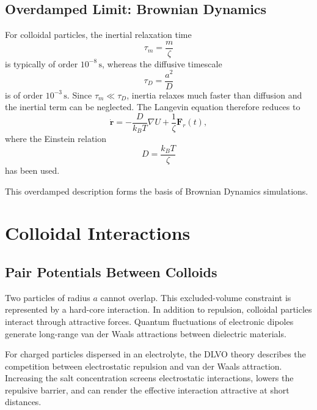 \documentclass[11pt,a4paper]{article}
\begin{document}
\subsection{Overdamped Limit: Brownian Dynamics}

For colloidal particles, the inertial relaxation time
\begin{equation}
    \tau_m = \frac{m}{\zeta}
\end{equation}
is typically of order $10^{-8}\,\mathrm{s}$, whereas the diffusive timescale
\begin{equation}
    \tau_D = \frac{a^2}{D}
\end{equation}
is of order $10^{-3}\,\mathrm{s}$. Since $\tau_m \ll \tau_D$, inertia relaxes much faster than diffusion and the inertial term can be neglected. The Langevin equation therefore reduces to
\begin{equation}
    \dot{\mathbf r}
    =
    -\frac{D}{k_B T}\nabla U
    +
    \frac{1}{\zeta}\mathbf F_r(t),
    \label{eq:bd}
\end{equation}
where the Einstein relation
\begin{equation}
    D = \frac{k_B T}{\zeta}
\end{equation}
has been used.

This overdamped description forms the basis of Brownian Dynamics simulations.

\section{Colloidal Interactions}

\subsection{Pair Potentials Between Colloids}

Two particles of radius $a$ cannot overlap. This excluded-volume constraint is represented by a hard-core interaction. In addition to repulsion, colloidal particles interact through attractive forces. Quantum fluctuations of electronic dipoles generate long-range van der Waals attractions between dielectric materials.

For charged particles dispersed in an electrolyte, the DLVO theory describes the competition between electrostatic repulsion and van der Waals attraction. Increasing the salt concentration screens electrostatic interactions, lowers the repulsive barrier, and can render the effective interaction attractive at short distances. 
\end{document}
